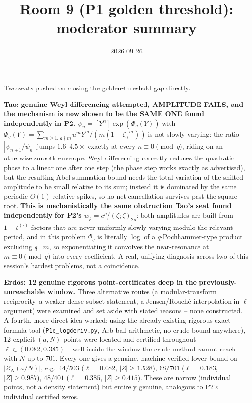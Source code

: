\documentclass[11pt]{article}
\title{Room 9 (P1 golden threshold): moderator summary}
\date{2026-09-26}
\begin{document}
\maketitle

Two seats pushed on closing the golden-threshold gap directly.

\textbf{Tao: genuine Weyl differencing attempted, AMPLITUDE FAILS, and the mechanism is now shown
to be the SAME ONE found independently in P2.} $\psi_n=[Y^n]\exp(\Phi_q(Y))$ with
$\Phi_q(Y)=\sum_{m\ge1,\,q\nmid m}u^mY^m/(m(1-\zeta_0^{-m}))$ is not slowly varying: the ratio
$|\psi_{n+1}/\psi_n|$ jumps $1.6$--$4.5\times$ exactly at every $n\equiv0\pmod q$, riding on an
otherwise smooth envelope. Weyl differencing correctly reduces the quadratic phase to a linear one
after one step (the phase step works exactly as advertised), but the resulting Abel-summation bound
needs the total variation of the shifted amplitude to be small relative to its sum; instead it is
dominated by the same periodic $O(1)$-relative spikes, so no net cancellation survives past the
square root. \textbf{This is mechanistically the same obstruction Tao's seat found independently
for P2's $w_\rho=c^\rho/(\zeta;\zeta)_{2\rho}$}: both amplitudes are built from $1-\zeta^{(\cdot)}$
factors that are never uniformly slowly varying modulo the relevant period, and in this problem
$\Phi_q$ is literally $\log$ of a $q$-Pochhammer-type product excluding $q\mid m$, so exponentiating
it convolves the near-resonance at $m\equiv0\pmod q$ into every coefficient. A real, unifying
diagnosis across two of this session's hardest problems, not a coincidence.

\textbf{Erd\H os: 12 genuine rigorous point-certificates deep in the previously-unreachable
window.} Three alternative routes (a modular-transform reciprocity, a weaker dense-subset
statement, a Jensen/Rouch\'e interpolation-in-$\ell$ argument) were examined and set aside with
stated reasons -- none constructed. A fourth, more direct idea worked: using the already-existing
rigorous exact-formula tool (\texttt{P1e\_logderiv.py}, Arb ball arithmetic, no crude bound
anywhere), 12 explicit $(a,N)$ points were located and certified throughout $\ell\in(0.082,0.385)$
-- well inside the window the crude method cannot reach -- with $N$ up to $701$. Every one gives a
genuine, machine-verified lower bound on $|Z_N(a/N)|$, e.g.\ $44/503$ ($\ell=0.082$,
$|Z|\ge1.528$), $68/701$ ($\ell=0.183$, $|Z|\ge0.987$), $48/401$ ($\ell=0.385$, $|Z|\ge0.415$).
These are narrow (individual points, not a density statement) but entirely genuine, analogous to
P2's individual certified zeros.
\end{document}
